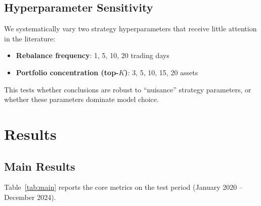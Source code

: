 \documentclass[11pt]{article}
\begin{document}
\subsection{Hyperparameter Sensitivity}

We systematically vary two strategy hyperparameters that receive little attention in the literature:
\begin{itemize}[leftmargin=1.4em]
  \item \textbf{Rebalance frequency}: 1, 5, 10, 20 trading days
  \item \textbf{Portfolio concentration (top-$K$)}: 3, 5, 10, 15, 20 assets
\end{itemize}

This tests whether conclusions are robust to ``nuisance'' strategy parameters, or whether these parameters dominate model choice.


\section{Results}
\label{sec:results}

\subsection{Main Results}

Table~\ref{tab:main} reports the core metrics on the test period (January 2020 -- December 2024).
\end{document}

